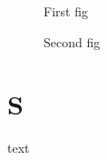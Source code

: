\documentclass{article}
\begin{document}
\listoffigures

\begin{figure}\caption{First fig}\end{figure}
\begin{figure}\caption{Second fig}\end{figure}

\section{S}
text
\end{document}
